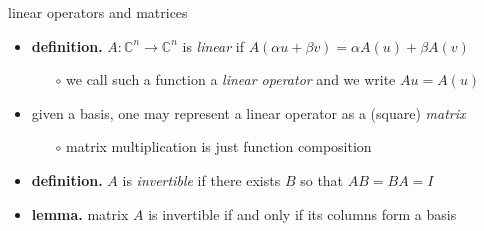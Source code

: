 \documentclass[10pt,hyperref]{beamer}
\newcommand{\CC}{\mathbb{C}}
\begin{document}
\begin{frame}{linear operators and matrices}

\begin{itemize}
\item \textbf{definition.}  $A:\CC^n \to \CC^n$ is \emph{linear} if $A(\alpha u+\beta v) = \alpha A(u) + \beta A(v)$
    \begin{itemize}
    \item[$\circ$] we call such a function a \emph{linear operator} and we write $Au=A(u)$
    \end{itemize}
\item given a basis, one may represent a linear operator as a (square) \emph{matrix}
    \begin{itemize}
    \item[$\circ$] matrix multiplication is just function composition
    \end{itemize}
\item \textbf{definition.} $A$ is \emph{invertible} if there exists $B$ so that $AB=BA=I$
\item \textbf{lemma.} matrix $A$ is invertible if and only if its columns form a basis
\end{itemize}
\end{frame}
\end{document}
